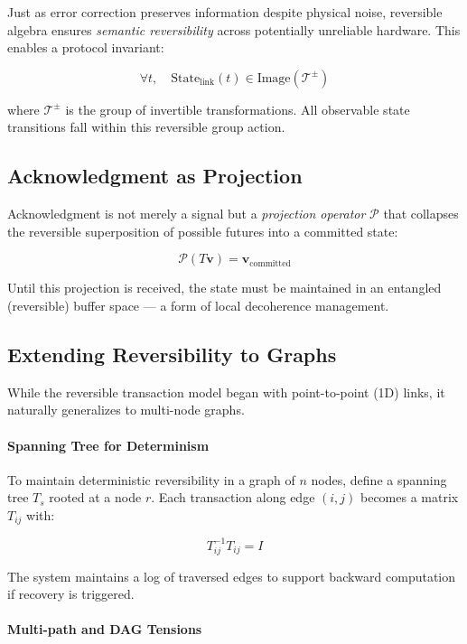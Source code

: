 Just as error correction preserves information despite physical noise, reversible algebra ensures \emph{semantic reversibility} across potentially unreliable hardware. This enables a protocol invariant:

\[
\forall t, \quad \text{State}_{\text{link}}(t) \in \text{Image}(\mathcal{T}^{\pm})
\]

where $\mathcal{T}^{\pm}$ is the group of invertible transformations. All observable state transitions fall within this reversible group action.

\subsection*{Acknowledgment as Projection}

Acknowledgment is not merely a signal but a \emph{projection operator} $\mathcal{P}$ that collapses the reversible superposition of possible futures into a committed state:

\[
\mathcal{P}(T\mathbf{v}) = \mathbf{v}_{\text{committed}}
\]

Until this projection is received, the state must be maintained in an entangled (reversible) buffer space — a form of local decoherence management.

\subsection*{Extending Reversibility to Graphs}

While the reversible transaction model began with point-to-point (1D) links, it naturally generalizes to multi-node graphs.

\paragraph{Spanning Tree for Determinism}

To maintain deterministic reversibility in a graph of $n$ nodes, define a spanning tree $T_s$ rooted at a node $r$. Each transaction along edge $(i, j)$ becomes a matrix $T_{ij}$ with:

\[
T_{ij}^{-1} T_{ij} = I
\]

The system maintains a log of traversed edges to support backward computation if recovery is triggered.

\paragraph{Multi-path and DAG Tensions}

